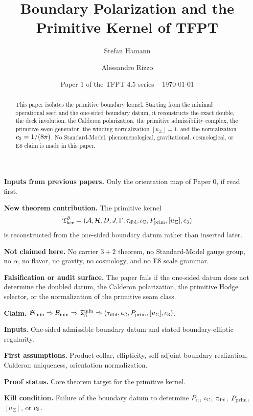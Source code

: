 \documentclass[11pt,a4paper]{article}
\title{\color{tfptblue}\textbf{Boundary Polarization and the Primitive Kernel of TFPT}}
\author{Stefan Hamann \and Alessandro Rizzo}
\date{{\normalsize\color{tfptgray}\sffamily Paper 1 of the TFPT 4.5 series -- \today}}
\begin{document}
\maketitle

\begin{abstract}
This paper isolates the primitive boundary kernel. Starting from the minimal operational seed and
the one-sided boundary datum, it reconstructs the exact double, the deck involution, the Calderon
polarization, the primitive admissibility complex, the primitive seam generator, the winding
normalization $[u_\Sigma]=1$, and the normalization $c_3=1/(8\pi)$. No Standard-Model,
phenomenological, gravitational, cosmological, or E8 claim is made in this paper.
\end{abstract}

\begin{tfptfrontbox}
\textbf{Inputs from previous papers.} Only the orientation map of Paper 0, if read first.

\textbf{New theorem contribution.} The primitive kernel
\[
\mathfrak T_{\mathrm{ker}}^\partial=(\mathcal A,\mathcal H,D,J,\Gamma,\tau_{\mathrm{dbl}},\iota_{\mathrm C},P_{\mathrm{prim}},[u_\Sigma],c_3)
\]
is reconstructed from the one-sided boundary datum rather than inserted later.

\textbf{Not claimed here.} No carrier $3+2$ theorem, no Standard-Model gauge group, no $\alpha$,
no flavor, no gravity, no cosmology, and no E8 scale grammar.

\textbf{Falsification or audit surface.} The paper fails if the one-sided datum does not determine
the doubled datum, the Calderon polarization, the primitive Hodge selector, or the normalization of
the primitive seam class.
\end{tfptfrontbox}


\begin{tfptclaimcontract}
\textbf{Claim.} $\mathfrak S_{\min}\Rightarrow\mathcal B_{\min}\Rightarrow\mathfrak T_{\partial}^{\min}\Rightarrow(\tau_{\mathrm{dbl}},\iota_{\mathrm C},P_{\mathrm{prim}},[u_\Sigma],c_3)$.\par
\textbf{Inputs.} One-sided admissible boundary datum and stated boundary-elliptic regularity.\par
\textbf{First assumptions.} Product collar, ellipticity, self-adjoint boundary realization, Calderon uniqueness, orientation normalization.\par
\textbf{Proof status.} Core theorem target for the primitive kernel.\par
\textbf{Kill condition.} Failure of the boundary datum to determine $P_C$, $\iota_{\mathrm C}$, $\tau_{\mathrm{dbl}}$, $P_{\mathrm{prim}}$, $[u_\Sigma]$, or $c_3$.\par
\end{tfptclaimcontract}
\end{document}
